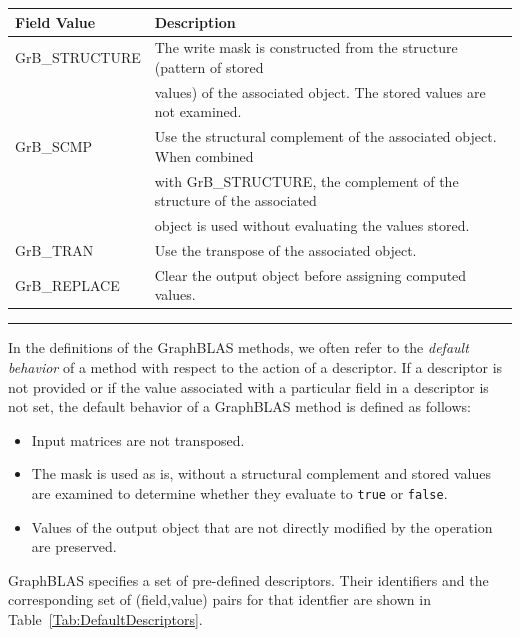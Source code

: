 \begin{table}
\begin{center}
\begin{tabular}{l|l}
Field Value          & Description \\ \hline
{\sf GrB\_STRUCTURE} &  The write mask is constructed from the structure (pattern of stored \\
                     &  values) of the associated object. The stored values are not examined.\\
{\sf GrB\_SCMP}      &  Use the structural complement of the associated object. When combined \\ 
                     &  with {\sf GrB\_STRUCTURE}, the complement of the structure of the associated \\
                     &  object is used without evaluating the values stored.\\
{\sf GrB\_TRAN}      &  Use the transpose of the associated object.\\
{\sf GrB\_REPLACE}   &  Clear the output object before assigning computed values.\\
\end{tabular}
\end{center}
\hrule
\end{table}

In the definitions of the GraphBLAS methods, we often refer to the
\emph{default behavior} of a method with respect to the action of a
descriptor.   If a descriptor is not provided or if the value associated
with a particular field in a descriptor is not set, the default behavior
of a GraphBLAS method is defined as follows:
\begin{itemize}
\item Input matrices are not transposed.
\item The mask is used as is, without a structural complement and stored values are examined to determine whether they evaluate to {\tt true} or {\tt false}.

\item Values of the output object that are not directly modified by the operation are preserved.
\end{itemize}

GraphBLAS specifies a set of pre-defined descriptors. Their identifiers
and the corresponding set of (field,value) pairs for that
identfier are shown in Table~\ref{Tab:DefaultDescriptors}.

\newcommand{\grboutp}{{\sf GrB\_OUTP}}
\newcommand{\grbmask}{{\sf GrB\_MASK}}
\newcommand{\grbinp}[1]{{\sf GrB\_INP#1}}
\newcommand{\grbreplace}{{\sf GrB\_REPLACE}}
\newcommand{\grbstructure}{{\sf GrB\_STRUCTURE}}
\newcommand{\grbscmp}{{\sf GrB\_SCMP}}
\newcommand{\grbtran}{{\sf GrB\_TRAN}}


